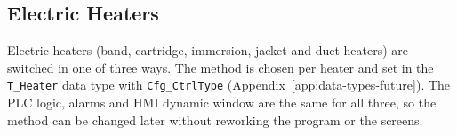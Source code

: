 \subsection{Electric Heaters}\label{sec:heaters}\newmark
Electric heaters (band, cartridge, immersion, jacket and duct heaters) are switched in one of three ways. The method is chosen per heater and set in the \texttt{T\_Heater} data type with \texttt{Cfg\_CtrlType} (Appendix~\ref{app:data-types-future}). The PLC logic, alarms and HMI dynamic window are the same for all three, so the method can be changed later without reworking the program or the screens.

